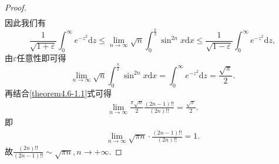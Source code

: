 \documentclass[../../main.tex]{subfiles}%
\begin{document}
\begin{proof}
\begin{align*}
\end{align*}
因此我们有
\[
\frac{1}{\sqrt{1 + \varepsilon}}\int_{0}^{\infty}e^{-z^{2}}\mathrm{d}z\leqslant\lim_{n\rightarrow\infty}\sqrt{n}\int_{0}^{\frac{\pi}{2}}\sin^{2n}x \mathrm{d}x\leqslant\frac{1}{\sqrt{1 - \varepsilon}}\int_{0}^{\infty}e^{-z^{2}}\mathrm{d}z,
\]
由\(\varepsilon\)任意性即可得
\[
\lim_{n\rightarrow\infty}\sqrt{n}\int_{0}^{\frac{\pi}{2}}\sin^{2n}x \mathrm{d}x=\int_{0}^{\infty}e^{-z^{2}}\mathrm{d}z=\frac{\sqrt{\pi}}{2}.
\]
再结合\eqref{theorem4.6-1.1}式可得
\begin{align*}
\lim_{n\rightarrow \infty} \frac{\pi \sqrt{n}}{2}\frac{(2n-1)!!}{(2n)!!}=\frac{\sqrt{\pi}}{2}.
\end{align*}
即
\begin{align*}
\lim_{n\rightarrow \infty} \sqrt{\pi n}\cdot \frac{(2n-1)!!}{(2n)!!}=1.
\end{align*}
故$\frac{(2n)!!}{(2n-1)!!}\sim \sqrt{\pi n},n\rightarrow +\infty $.

\end{proof}
\end{document}
